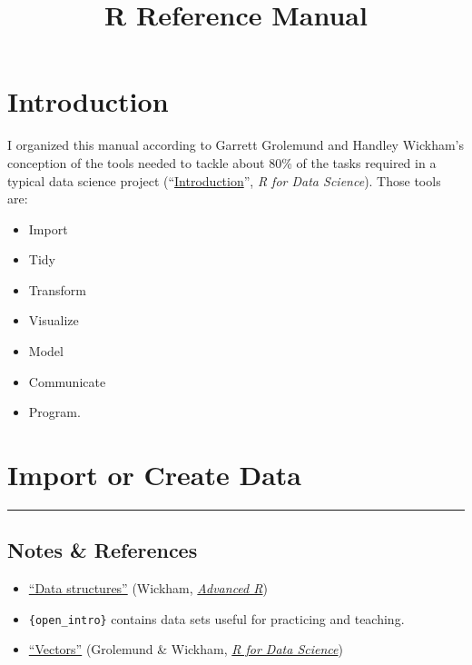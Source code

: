 \documentclass[]{book}
\title{R Reference Manual}
\author{}
\date{\vspace{-2.5em}}
\providecommand{\tightlist}{%
  \setlength{\itemsep}{0pt}\setlength{\parskip}{0pt}}
\begin{document}
\maketitle

{
\setcounter{tocdepth}{1}
\tableofcontents
}
\hypertarget{introduction}{%
\chapter{Introduction}\label{introduction}}

I organized this manual according to Garrett Grolemund and Handley Wickham's conception of the tools needed to tackle about 80\% of the tasks required in a typical data science project (``\href{https://r4ds.had.co.nz/introduction.html}{Introduction}'', \emph{R for Data Science}). Those tools are:

\begin{itemize}
\tightlist
\item
  Import
\item
  Tidy
\item
  Transform
\item
  Visualize
\item
  Model
\item
  Communicate
\item
  Program.

  \hypertarget{htmlwidget-afbf728bf59138443395}{}
\end{itemize}

\hypertarget{import-or-create-data}{%
\chapter{Import or Create Data}\label{import-or-create-data}}

\begin{center}\rule{0.5\linewidth}{\linethickness}\end{center}

\hypertarget{notes-references}{%
\section{Notes \& References}\label{notes-references}}

\begin{itemize}
\tightlist
\item
  \href{http://adv-r.had.co.nz/Data-structures.html}{``Data structures''} (Wickham, \href{http://adv-r.had.co.nz/}{\emph{Advanced R}})
\item
  \texttt{\{open\_intro\}} contains data sets useful for practicing and teaching.
\item
  \href{https://r4ds.had.co.nz/vectors.html}{``Vectors''} (Grolemund \& Wickham, \href{https://r4ds.had.co.nz/}{\emph{R for Data Science}})
\end{itemize}
\end{document}

